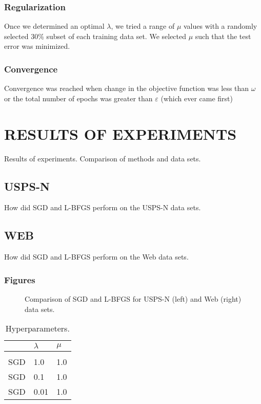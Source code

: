 \subsubsection{Regularization}
Once we determined an optimal $\lambda$, we tried a range of $\mu$ values with a randomly selected 30\% subset of each training data set. We selected $\mu$ such that the test error was minimized.

\subsubsection{Convergence}
Convergence was reached when change in the objective function was less than $\omega$ or the total number of epochs was greater than $\varepsilon$ (which ever came first)




\section{RESULTS OF EXPERIMENTS}
\label{sec:results}

Results of experiments. Comparison of methods and data sets.

\subsection{USPS-N}
How did SGD and L-BFGS perform on the USPS-N data sets.

\subsection{WEB}
How did SGD and L-BFGS perform on the Web data sets.


\subsubsection{Figures} 

\begin{figure}[h]
\vspace{1in}
\caption{Comparison of SGD and L-BFGS for USPS-N (left) and Web (right) data sets.}
\end{figure}

\begin{table}[t]
\caption{Hyperparameters.}
\label{tab-hyperparameters}
\begin{center}
\begin{tabular}{lll}
& $\lambda$  & $\mu$
\\ \hline \\
SGD & 1.0  & 1.0 \\
SGD & 0.1  & 1.0 \\
SGD & 0.01 & 1.0 \\
\end{tabular}
\end{center}
\end{table}



